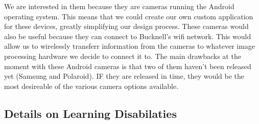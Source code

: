 \documentclass{article}
\begin{document}
We are interested in them because they are cameras running the Android operating system. This means that we could create our own custom application for these devices, greatly simplifying our design process. These cameras would also be useful because they can connect to Bucknell's wifi network. This would allow us to wirelessly transferr information from the cameras to whatever image processing hardware we decide to connect it to. The main drawbacks at the moment with these Android cameras is that two of them haven't been released yet (Samsung and Polaroid). IF they are released in time, they would be the most desireable of the various camera options available.

\subsection*{Details on Learning Disabilaties}
\end{document}
